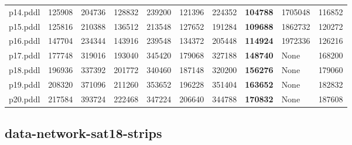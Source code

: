 \documentclass{article}
\begin{document}
\begin{tabular}{@{}lrrrrrrrrr@{}}
p14.pddl & 125908 & 204736 & 128832 & 239200 & 121396 & 224352 & \textbf{104788} & 1705048 & 116852 \\
p15.pddl & 125816 & 210388 & 136512 & 213548 & 127652 & 191284 & \textbf{109688} & 1862732 & 120272 \\
p16.pddl & 147704 & 234344 & 143916 & 239548 & 134372 & 205448 & \textbf{114924} & 1972336 & 126216 \\
p17.pddl & 177748 & 319016 & 193040 & 345420 & 179068 & 327188 & \textbf{148740} & \multicolumn{1}{|l|}{None} & 168200 \\
p18.pddl & 196936 & 337392 & 201772 & 340460 & 187148 & 320200 & \textbf{156276} & \multicolumn{1}{|l|}{None} & 179060 \\
p19.pddl & 208320 & 371096 & 211260 & 353652 & 196228 & 351404 & \textbf{163652} & \multicolumn{1}{|l|}{None} & 182832 \\
p20.pddl & 217584 & 393724 & 222468 & 347224 & 206640 & 344788 & \textbf{170832} & \multicolumn{1}{|l|}{None} & 187608 \\
\end{tabular}

\hypertarget{search_start_memory-data-network-sat18-strips}{}
\subsection*{data-network-sat18-strips}
\end{document}
